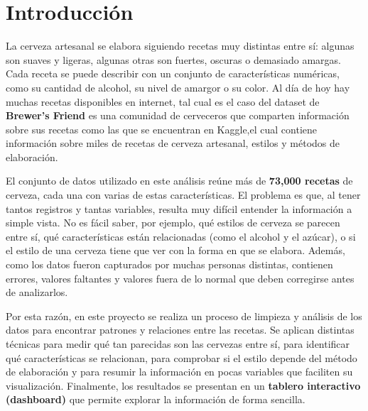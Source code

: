 \documentclass[11pt]{article}
\begin{document}
\section{Introducción}

La cerveza artesanal se elabora siguiendo recetas muy distintas entre sí: algunas
son suaves y ligeras, algunas otras son fuertes, oscuras o demasiado amargas. Cada receta se puede
describir con un conjunto de características numéricas, como su cantidad de alcohol,
su nivel de amargor o su color. Al día de hoy hay muchas recetas disponibles en internet, 
tal cual es el caso del dataset de \textbf{Brewer's Friend} es una comunidad de cerveceros que comparten 
información sobre sus recetas como las que se encuentran en Kaggle,el cual contiene información sobre miles de 
recetas de cerveza artesanal, estilos y métodos de elaboración.

El conjunto de datos utilizado en este análisis reúne más de \textbf{73{,}000 recetas}
de cerveza, cada una con varias de estas características. El problema es que, al tener
tantos registros y tantas variables, resulta muy difícil entender la información
a simple vista. No es fácil saber, por ejemplo, qué estilos de cerveza se parecen
entre sí, qué características están relacionadas (como el alcohol y el azúcar), o si
el estilo de una cerveza tiene que ver con la forma en que se elabora. Además, como
los datos fueron capturados por muchas personas distintas, contienen errores,
valores faltantes y valores fuera de lo normal que deben corregirse antes de
analizarlos.

Por esta razón, en este proyecto se realiza un proceso de limpieza y análisis de los
datos para encontrar patrones y relaciones entre las recetas. Se aplican distintas
técnicas para medir qué tan parecidas son las cervezas entre sí, para identificar
qué características se relacionan, para comprobar si el estilo depende del método de
elaboración y para resumir la información en pocas variables que faciliten su
visualización. Finalmente, los resultados se presentan en un \textbf{tablero
interactivo (dashboard)} que permite explorar la información de forma sencilla.
\end{document}
